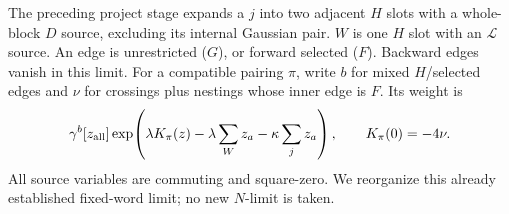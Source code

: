\documentclass[11pt]{article}
\begin{document}
The preceding project stage expands a $j$ into two adjacent $H$ slots
with a whole-block $D$ source, excluding its internal Gaussian pair.
$W$ is one $H$ slot with an $\mathcal L$ source. An edge is unrestricted
($G$), or forward selected ($F$). Backward edges vanish in this limit.
For a compatible pairing $\pi$, write $b$ for mixed $H$/selected edges
and $\nu$ for crossings plus nestings whose inner edge is $F$. Its weight is
\begin{equation}\label{input}
 \gamma^b[z_{\rm all}]
 \exp\!\left(\lambda K_\pi(z)
       -\lambda\sum_Wz_a-\kappa\sum_jz_a\right),
 \qquad K_\pi(0)=-4\nu .
\end{equation}
All source variables are commuting and square-zero. We reorganize
this already established fixed-word limit; no new $N$-limit is taken.

\newpage
\end{document}
